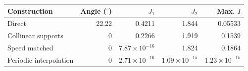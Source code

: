 \begin{tabular}{lrrrr}
\toprule
Construction & Angle ($^\circ$) & $J_1$ & $J_2$ & Max. $I$ \\
\midrule
Direct & 22.22 & 0.4211 & 1.844 & 0.05533 \\
Collinear supports & 0 & 0.2266 & 1.919 & 0.1539 \\
Speed matched & 0 & $7.87\times 10^{-16}$ & 1.824 & 0.1864 \\
Periodic interpolation & 0 & $2.71\times 10^{-16}$ & $1.09\times 10^{-15}$ & $1.23\times 10^{-15}$ \\
\bottomrule
\end{tabular}
